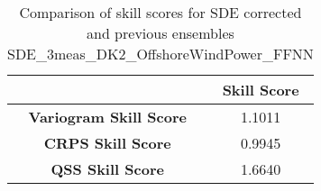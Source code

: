
        \begin{table}[h!]
            \centering
            \begin{tabular}{|c|c|}
                \hline
                & \textbf{Skill Score}  \\
                \hline
                \textbf{Variogram Skill Score} & 1.1011  \\
                \hline
                \textbf{CRPS Skill Score} & 0.9945  \\
                \hline
                \textbf{QSS Skill Score} & 1.6640 \\
                \hline
            \end{tabular}
            \caption{Comparison of skill scores for SDE corrected and previous ensembles SDE_3meas_DK2_OffshoreWindPower_FFNN}
            \label{table:skill_scores_comparison}
        \end{table}
        